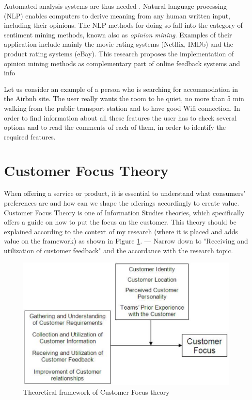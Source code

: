 Automated analysis systems are thus needed \cite{liu2012sentiment}. Natural language processing (NLP) enables computers to derive meaning from any human written input, including their opinions. The NLP methods for doing so fall into the category of sentiment mining methods, known also as \textit{opinion mining}. Examples of their application include mainly the movie rating systems (Netflix, IMDb) and the product rating systems (eBay). This research proposes the implementation of opinion mining methods as complementary part of online feedback systems and info


Let us consider an example of a person who is searching for accommodation in the Airbnb site. The user really wants the room to be quiet, no more than 5 min walking from the public transport station and to have good Wifi connection. In order to find information about all these features the user has to check several options and to read the comments of each of them, in order to identify the required features.



\section{Customer Focus Theory}
\label{sec:CFTH}

When offering a service or product, it is essential to understand what consumers' preferences are and how can we shape the offerings accordingly to create value. Customer Focus Theory is one of Information Studies theories, which specifically offers a guide on how to put the focus on the customer. This theory should be explained according to the context of my research (where it is placed and adds value on the framework) as shown in Figure \ref{fig:CustomerFocus}. 
--- Narrow down to "Receiving and utilization of customer feedback" and the accordance with the research topic.

\label{sec:OFS}
\begin{figure}[h!]
	\centering
	\includegraphics[height=0.3\textheight]{fig01/CustomerFocus}
	\caption{Theoretical framework of Customer Focus theory}
	\label{fig:CustomerFocus}
\end{figure}

